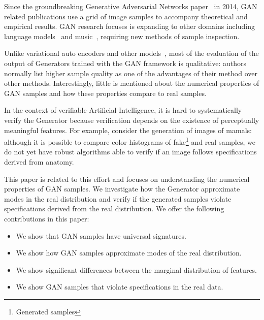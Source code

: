 Since the groundbreaking Generative Adversarial Networks
paper~\cite{goodfellow2014generative} in 2014, GAN related
publications use a grid of image samples to accompany theoretical and empirical
results. GAN research focuses is expanding to other domains including language 
models~\cite{gulrajani2017improved} and music~\cite{yang2017midigan}, requiring
new methods of sample inspection.

Unlike variational auto encoders and other
models~\cite{goodfellow2014generative}, most of the evaluation of the output
of Generators trained with the GAN framework is qualitative: authors normally 
list higher sample quality as one of the advantages of their method over other
methods.  Interestingly, little is mentioned about the numerical properties of
GAN samples and how these properties compare to real samples.

In the context of verifiable Artificial Intelligence\cite{seshia2016vai}, 
it is hard to systematically verify the Generator because verification depends 
on the existence of perceptually meaningful features. For example, consider the 
generation of images of mamals: although it is possible to compare color histograms 
of fake\footnote{Generated samples} and real samples, we do not yet have robust 
algorithms able to verify if an image follows specifications derived from anatomy. 

This paper is related to this effort and focuses on understanding the numerical 
properties of GAN samples. We investigate how the Generator approximate modes 
in the real distribution and verify if the generated samples violate specifications 
derived from the real distribution. We offer the following contributions in this paper: 
\begin{itemize}
\item We show that GAN samples have universal signatures.
\item We show how GAN samples approximate modes of the real distribution.
\item We show significant differences between the marginal distribution of features. 
\item We show GAN samples that violate specifications in the real data.
\end{itemize}
